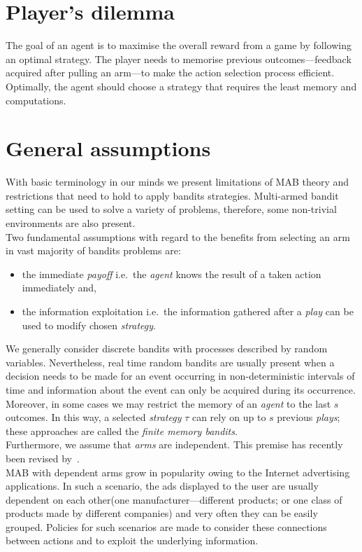 \documentclass[12pt, a4paper, pdflatex, leqno, twoside]{report}
\begin{document}
\section{Player's dilemma}
The goal of an agent is to maximise the overall reward from a game by following an optimal strategy. The player needs to memorise previous outcomes---feedback acquired after pulling an arm---to make the action selection process efficient. Optimally, the agent should choose a strategy that requires the least memory and computations.\\

\section{General assumptions}
With basic terminology in our minds we present limitations of MAB theory and restrictions that need to hold to apply bandits strategies.
Multi-armed bandit setting can be used to solve a variety of problems, therefore, 
some non-trivial environments are also present.\\

Two fundamental assumptions with regard to the benefits from selecting an arm in vast majority of bandits problems are:
\begin{itemize}
\item the immediate \emph{payoff} i.e.\ the \emph{agent} knows the result of a taken 
action immediately and,
\item the information exploitation i.e.\ the information gathered after a \emph{play} can be used to modify chosen \emph{strategy}.\\
\end{itemize}

We generally consider discrete bandits with processes described by random variables. Nevertheless, real time random bandits are usually present when a decision needs to be made 
for an event occurring in non-deterministic intervals of time and information about the event can only be acquired during its occurrence.\\

Moreover, in some cases we may restrict the memory of an \emph{agent} to the last 
$s$ outcomes. In this way, a selected \emph{strategy} $\tau$ can rely on up to $s$ 
previous \emph{plays}; these approaches are called the \emph{finite 
memory bandits}.\\

Furthermore, we assume that \emph{arms} are independent. This premise has recently been revised by~\citep{Pandey:2007:MBP:1273496.1273587}.\\
MAB with dependent arms grow in popularity owing to the Internet advertising 
applications. In such a scenario, the ads displayed to the user are usually
dependent on each other(one manufacturer---different products; or one class of products made by 
different companies) and very often they  can be easily grouped. Policies for 
such scenarios are made to consider these connections between actions and to 
exploit the underlying information.\\
\end{document}
